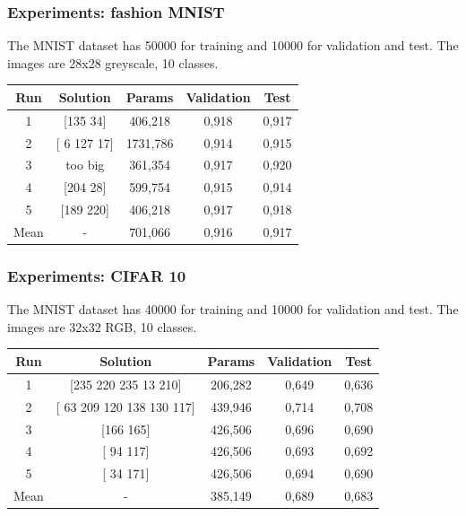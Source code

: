 \documentclass[aspectratio=169]{beamer}
\begin{document}
		\begin{frame}
			\frametitle{Experiments: fashion MNIST}
			
			The MNIST dataset has 50000 for training and 10000 for validation and test. The images are 28x28 greyscale, 10 classes.
			
			\begin{table}
				\begin{tabular}{c|c|c|c|c}
					\hline
					Run  &   Solution    &  Params  & Validation & Test  \\ \hline
					 1   &   [135  34]   & 406,218  &   0,918    & 0,917 \\
					 2   & [  6 127  17] & 1731,786 &   0,914    & 0,915 \\
					 3   &    too big    & 361,354  &   0,917    & 0,920 \\
					 4   &   [204  28]   & 599,754  &   0,915    & 0,914 \\
					 5   &   [189 220]   & 406,218  &   0,917    & 0,918 \\
					Mean &       -       & 701,066  &   0,916    & 0,917 \\ \hline
				\end{tabular}
			\end{table}
		
		\end{frame}
		\begin{frame}
			\frametitle{Experiments: CIFAR 10}
			
			The MNIST dataset has 40000 for training and 10000 for validation and test. The images are 32x32 RGB, 10 classes.
			
			\begin{table}
				\begin{tabular}{c|c|c|c|c}
					\hline
					Run  &         Solution          & Params  & Validation & Test  \\ \hline
					 1   &   [235 220 235  13 210]   & 206,282 &   0,649    & 0,636 \\
					 2   & [ 63 209 120 138 130 117] & 439,946 &   0,714    & 0,708 \\
					 3   &         [166 165]         & 426,506 &   0,696    & 0,690 \\
					 4   &         [ 94 117]         & 426,506 &   0,693    & 0,692 \\
					 5   &         [ 34 171]         & 426,506 &   0,694    & 0,690 \\
					Mean &             -             & 385,149 &   0,689    & 0,683 \\ \hline
				\end{tabular}
			\end{table}
		
		\end{frame}
\end{document}
